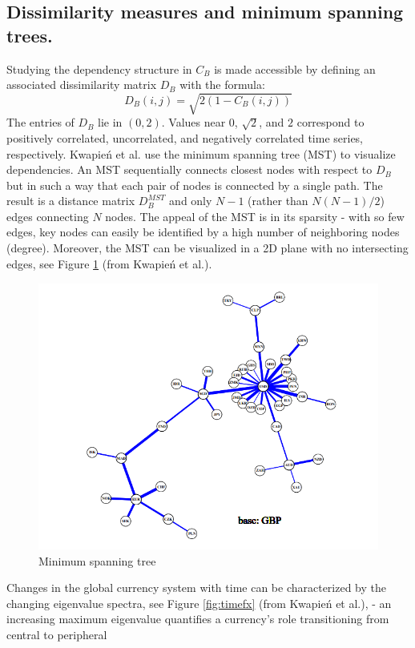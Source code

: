 \documentclass[a4paper]{article}
\begin{document}
\begin{multicols}{2}
\subsection{Dissimilarity measures and minimum spanning trees.}\label{dist}
Studying the dependency structure in $C_B$ is made accessible by defining an associated dissimilarity matrix $D_B$ with the formula:
$$D_B(i,j)=\sqrt{2(1-C_B(i, j))}$$
The entries of $D_B$ lie in $(0, 2)$. Values near $0$, $\sqrt{2}$, and $2$ correspond to positively correlated, uncorrelated, and negatively correlated time series, respectively.
Kwapień et al. use the minimum spanning tree (MST) to visualize dependencies. An MST sequentially connects closest nodes with respect to $D_B$ but in such a way that each pair of nodes is connected by a single path. The result is a distance matrix $D_B^{MST}$ and only $N-1$ (rather than $N(N-1)/2$) edges connecting $N$ nodes. The appeal of the MST is in its sparsity - with so few edges, key nodes can easily be identified by a high number of neighboring nodes (degree). Moreover, the MST can be visualized in a 2D plane with no intersecting edges, see Figure \ref{fig:mstfx} (from Kwapień et al.).
\begin{figure}[H]
\centering
    \includegraphics[totalheight=6cm]{MSTfx.PNG}
    \caption{Minimum spanning tree}	
    \label{fig:mstfx}
\end{figure}
Changes in the global currency system with time can be characterized by the changing eigenvalue spectra, see Figure \ref{fig:timefx} (from Kwapień et al.), - an increasing maximum eigenvalue quantifies a currency's role transitioning from central to peripheral  

\end{multicols}
\end{document}

